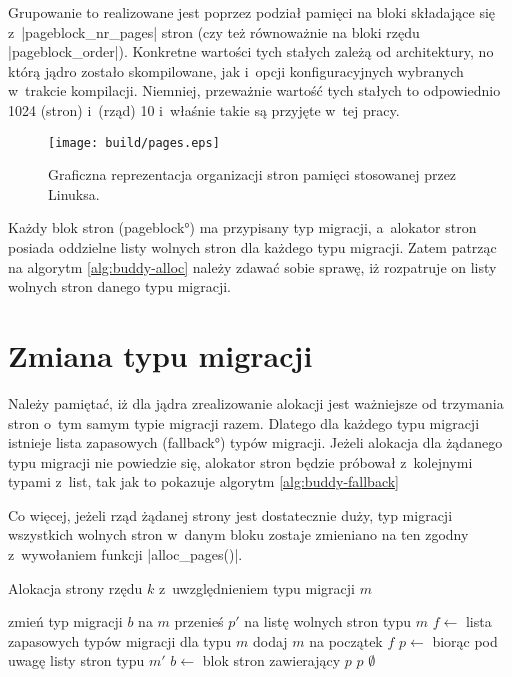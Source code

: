 Grupowanie to realizowane jest poprzez podział pamięci na bloki
składające się z~\code|pageblock_nr_pages| stron (czy też
równoważnie na bloki rzędu \code|pageblock_order|).  Konkretne
wartości tych stałych zależą od architektury, no którą jądro zostało
skompilowane, jak i~opcji konfiguracyjnych wybranych w~trakcie
kompilacji.  Niemniej, przeważnie wartość tych stałych to odpowiednio
1024 (stron) i~(rząd) 10 i~właśnie takie są przyjęte w~tej pracy.

\begin{figure}[tbh]
\begin{center}
\texttt{[image: build/pages.eps]}
\end{center}
\caption{Graficzna reprezentacja organizacji stron pamięci stosowanej
  przez Linuksa.}
\end{figure}

Każdy blok stron (\ang{pageblock}) ma przypisany typ migracji,
a~alokator stron posiada oddzielne listy wolnych stron dla każdego
typu migracji.  Zatem patrząc na algorytm \ref{alg:buddy-alloc} należy
zdawać sobie sprawę, iż rozpatruje on listy wolnych stron danego typu
migracji.

\section{Zmiana typu migracji}\label{sec:type-change}

Należy pamiętać, iż dla jądra zrealizowanie alokacji jest ważniejsze
od trzymania stron o~tym samym typie migracji razem.  Dlatego dla
każdego typu migracji istnieje lista zapasowych (\ang{fallback}) typów
migracji.  Jeżeli alokacja dla żądanego typu migracji nie powiedzie
się, alokator stron będzie próbował z~kolejnymi typami z~list, tak jak
to pokazuje algorytm \ref{alg:buddy-fallback}

Co więcej, jeżeli rząd żądanej strony jest dostatecznie duży, typ
migracji wszystkich wolnych stron w~danym bloku zostaje zmieniano na
ten zgodny z~wywołaniem funkcji \code|alloc_pages()|.

\begin{algorithm}
\caption{Alokacja strony rzędu $k$ z~uwzględnieniem typu migracji $m$}
\label{alg:buddy-fallback}
\begin{algorithmic}[1]
\State zmień typ migracji $b$ na $m$
    \State przenieś $p'$ na listę wolnych stron typu $m$
\EndFor
\EndFunction
\Statex
{}
    \State $f \gets$ lista zapasowych typów migracji dla typu $m$
    \State dodaj $m$ na początek $f$
        \State $p \gets$  biorąc pod uwagę listy stron typu $m'$
                \State $b \gets$ blok stron zawierający $p$
                \State {}
            \EndIf
            \State \Return $p$
        \EndIf
    \EndFor
    \State \Return $\emptyset$
\EndFunction
\end{algorithmic}
\end{algorithm}

